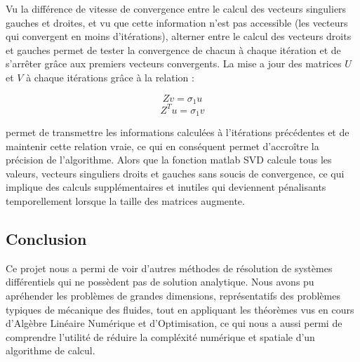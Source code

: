 \documentclass[fleqn]{article}
\begin{document}
Vu la différence de vitesse de convergence entre le calcul des vecteurs singuliers gauches et droites, et vu que cette information n'est pas accessible (les vecteurs qui convergent en moins d'itérations), 
alterner entre le calcul des vecteurs droits et gauches permet de tester la convergence de chacun à chaque itération et de s'arrêter  grâce aux premiers vecteurs convergents. La mise a jour des matrices $U$ et $V$ à chaque itérations grâce à la relation :

$$ Zv = \sigma_1u $$ 
$$ Z^Tu = \sigma_1v $$

permet de transmettre les informations calculées à l'itérations précédentes et de maintenir cette relation vraie, ce qui en conséquent permet d'accroître la précision de l'algorithme. Alors que la fonction matlab SVD calcule tous les valeurs, vecteurs singuliers droits et gauches sans soucis de convergence, ce qui implique des calculs supplémentaires et inutiles qui deviennent pénalisants temporellement lorsque la taille des matrices augmente.

\pagebreak

\subsection{Conclusion}

Ce projet nous a permi de voir d'autres méthodes de résolution de systèmes différentiels qui ne possèdent pas de solution analytique. Nous avons pu apréhender les problèmes de grandes dimensions, représentatifs des problèmes typiques de mécanique des fluides, tout en appliquant les théorèmes vus en cours d'Algèbre Linéaire Numérique et d'Optimisation, ce qui nous a aussi permi de comprendre l'utilité de réduire la compléxité numérique et spatiale d'un algorithme de calcul. 
\end{document}
